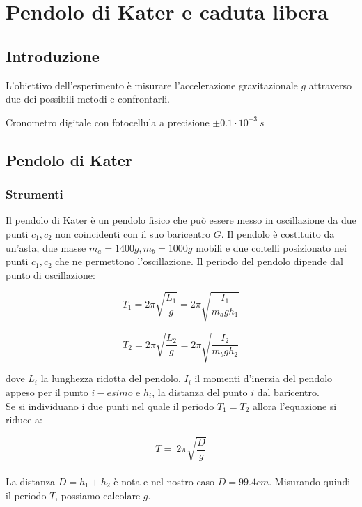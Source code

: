 \chapter{Pendolo di Kater e caduta libera}
\section{Introduzione}

L'obiettivo dell'esperimento è misurare l'accelerazione gravitazionale $g$ attraverso due dei possibili metodi e confrontarli. 


Cronometro digitale con fotocellula a precisione $\pm 0.1 \cdot 10^{-3}\ s$ 

\section{Pendolo di Kater}

\subsection{Strumenti}
Il pendolo di Kater è un pendolo fisico che può essere messo in oscillazione da due punti  $c_1,c_2$ non coincidenti con il suo baricentro $G$. Il pendolo è costituito da un'asta, due masse $m_a = 1400g, m_b=1000g$ mobili e due coltelli posizionato nei punti $c_1,c_2$ che ne permettono l'oscillazione. 
Il periodo del pendolo dipende dal punto di oscillazione:

$$ T_1 = 2 \pi \sqrt{\frac{L_1}{g}} = 2 \pi \sqrt{\frac{I_1}{m_a gh_1}}$$


$$ T_2 = 2 \pi \sqrt{\frac{L_2}{g}} = 2 \pi \sqrt{\frac{I_2}{m_b gh_2}}$$

dove $L_i$ la lunghezza ridotta del pendolo, $I_i$ il momenti d'inerzia del pendolo appeso per il punto $i-esimo$  e $h_i$, la distanza del punto $i$ dal baricentro. 
\\
Se si individuano i due punti nel quale il periodo $T_1 = T_2$ allora l'equazione si riduce a:

$$ T = \ 2 \pi \sqrt{\frac{D}{g}}$$
\\
La distanza $D= h_1 + h_2 $  è nota e nel nostro caso $ D= 99.4 cm$. Misurando quindi il periodo $T$, possiamo calcolare $g$. 
